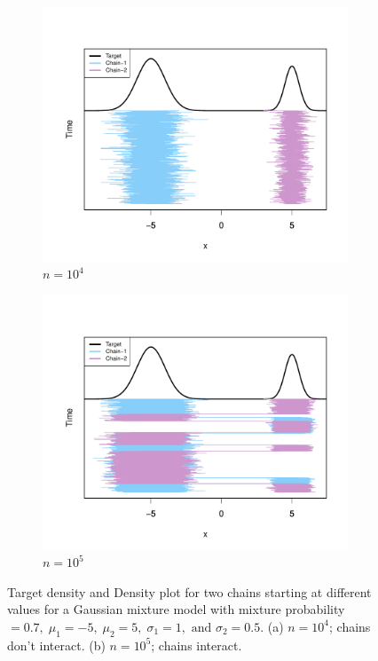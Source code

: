 \documentclass[11pt]{article}
\theoremstyle{remark}
\begin{document}
\begin{figure}[htbp]
    \begin{subfigure}{.5\textwidth}
   \centering
   \includegraphics[width=\linewidth]{plots/gaussian-Targettrace_n1e4.pdf}
   \caption{$n = 10^4$}
   \label{subfig:gauss-trace_1e4}
 \end{subfigure}
 \begin{subfigure}{0.5\textwidth}
   \centering
   \includegraphics[width=\linewidth]{plots/gaussian-Targettrace_n1e5.pdf} 
   \caption{$n = 10^5$}
   \label{subfig:gauss-trace_1e5}
 \end{subfigure}
    \caption{Target density and Density plot for two chains starting at different values for a Gaussian mixture model with mixture probability $= 0.7, \; \mu_1 = -5, \; \mu_2 = 5, \; \sigma_1 = 1, \textrm{ and } \sigma_2 = 0.5$. (a) $n = 10^4$; chains don't interact. (b) $n = 10^5$; chains interact.}
    \label{fig:gaussian-trace}
\end{figure}
\end{document}
